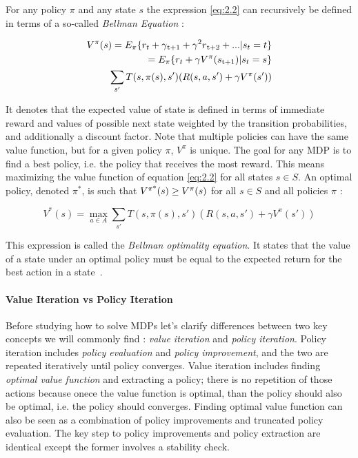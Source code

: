 For any policy $\pi$ and any state $s$ the expression \ref{eq:2.2} can recursively be defined in terms of a so-called \textit{Bellman Equation} :

\begin{equation}
\begin{split}
	V^\pi (s) = E_\pi\{r_t + \gamma\textsubscript{t+1} + \gamma^2 r\textsubscript{t+2} + ... | s_t = t\} \\
	= E_\pi \{r_t + \gamma V^\pi(s\textsubscript{t+1}) | s_t = s\} \\
	\sum_{s'}T(s, \pi(s), s') (R(s, a, s') + \gamma V^\pi (s'))
\end{split}	
\end{equation}

It denotes that the expected value of state is defined in terms of immediate reward and values of possible next state weighted by the transition probabilities, and additionally a discount factor. Note that multiple policies can have the same value function, but for a given policy $\pi$, $V^\pi$ is unique. The goal for any MDP is to find a best policy, i.e. the policy that receives the most reward. This means maximizing the value function of equation \ref{eq:2.2} for all states $s \in S$. An optimal policy, denoted $\pi^*$, is such that $V\textsuperscript{$\pi$*} (s) \geq V^\pi (s)$ for all $s \in S$ and all policies $\pi$ :

\begin{equation} 
\label{eq:2.5}
V^*(s) = \max_{a \in A} \sum_{s'}T(s, \pi(s), s') (R(s, a, s') + \gamma V^\pi (s'))
\end{equation}

This expression is called the \textit{Bellman optimality equation}. It states that the value of a state under an optimal policy must be equal to the expected return for the best action in a state~\cite{wiering2012reinforcement}.

\paragraph{Value Iteration vs Policy Iteration} Before studying how to solve MDPs let's clarify differences between two key concepts we will commonly find : \textit{value iteration} and \textit{policy iteration}. Policy iteration includes \textit{policy evaluation} and \textit{policy improvement}, and the two are repeated iteratively until policy converges. Value iteration includes finding \textit{optimal value function} and extracting a policy; there is no repetition of those actions because onece the value function is optimal, than the policy should also be optimal, i.e. the policy should converges. Finding optimal value function can also be seen as a combination of policy improvements and truncated policy evaluation. The key step to policy improvements and policy extraction are identical except the former involves a stability check. %

